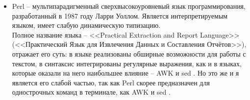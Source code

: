 \begin{itemize}
    \item Perl \autocite{perl} -- мультипарадигменный сверхвысокоуровневый 
        язык программирования, разработанный в 1987 году Ларри Уоллом.
        Является интерпретируемым языком, имеет слабую динамическую типизацию.\\
        Полное название языка -- <<Practical Extraction and Report Language>> 
        (<<Практический Язык для Извлечения Данных и Составления Отчётов>>), отражает его суть:
        в языке реализованы обширные возможности для работы с текстом, в синтаксис интегрированы 
        регулярные выражения, как и в языках, которые оказали на него наибольшее влияние --
        AWK \autocite{awk} и sed \autocite{sed}. Но это же и я является его слабой частью, так как
        Perl скорее предназначен для однострочных команд в терминале, как AWK \autocite{awk} и
        sed \autocite{sed}.
        

\end{itemize}
